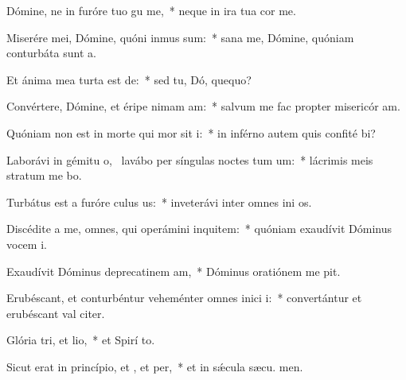 \item Dómine, ne in furóre tuo gu me,~* neque in ira tua cor me.
\item Miserére mei, Dómine, quóni inmus sum:~* sana me, Dómine, quóniam conturbáta sunt  a.
\item Et ánima mea turta est de:~* sed tu, Dó, quequo?
\item Convértere, Dómine, et éripe nimam am:~* salvum me fac propter misericór am.
\item Quóniam non est in morte qui mor sit i:~* in inférno autem quis confité bi?
\item Laborávi in gémitu o,~\pscross{} lavábo per síngulas noctes tum um:~* lácrimis meis stratum me bo.
\item Turbátus est a furóre culus us:~* inveterávi inter omnes ini os.
\item Discédite a me, omnes, qui operámini inquitem:~* quóniam exaudívit Dóminus vocem  i.
\item Exaudívit Dóminus deprecatinem am,~* Dóminus oratiónem me pit.
\item Erubéscant, et conturbéntur veheménter omnes inici i:~* convertántur et erubéscant val citer.
\item Glória tri, et lio,~* et Spirí to.
\item Sicut erat in princípio, et , et per,~* et in sǽcula sæcu. men.
